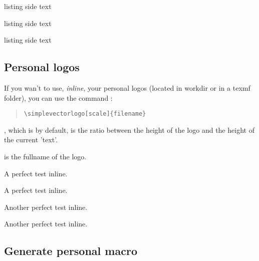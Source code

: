 \documentclass[11pt,a4paper]{ltxdoc}
\begin{document}
\begin{tcblisting}{listing side text}
\samplevectorlogo{\logoctanlion}
\end{tcblisting}

\begin{tcblisting}{listing side text}
\samplevectorlogo{\logotexworks}
\end{tcblisting}

\begin{tcblisting}{listing side text}
\samplevectorlogo{\logolatexproject}
\end{tcblisting}

\subsection{Personal logos}

If you wan't to use, \textit{inline}, your personal logos (located in workdir or in a \textsf{texmf} folder), you can use the command :

\begin{quote}
\begin{verbatim}
\simplevectorlogo[scale]{filename}
\end{verbatim}
\end{quote}

\MontreCode{[scale]}, which is  by default, is the ratio between the height of the logo and the height of the current 'text'.

 is the fullname of the logo.

\begin{tcblisting}{}
{\Huge A perfect test  inline.}
\end{tcblisting}

\begin{tcblisting}{}
{\Huge A perfect test  inline.}
\end{tcblisting}

\begin{tcblisting}{}
{\LARGE Another perfect test  inline.}
\end{tcblisting}

\begin{tcblisting}{}
{\LARGE Another perfect test  inline.}
\end{tcblisting}

\subsection{Generate personal macro}
\end{document}
